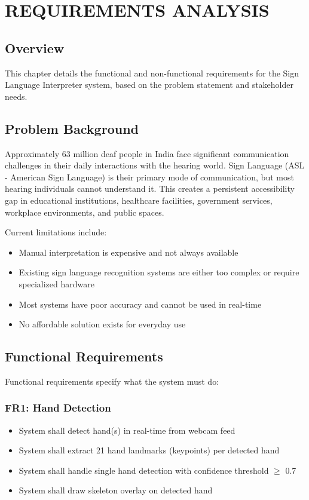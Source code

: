 \chapter{REQUIREMENTS ANALYSIS} \label{c3}
\justifying

\section{Overview}

This chapter details the functional and non-functional requirements for the Sign Language Interpreter system, based on the problem statement and stakeholder needs.

\vspace{1em}
\section{Problem Background}

Approximately 63 million deaf people in India face significant communication challenges in their daily interactions with the hearing world. Sign Language (ASL - American Sign Language) is their primary mode of communication, but most hearing individuals cannot understand it. This creates a persistent accessibility gap in educational institutions, healthcare facilities, government services, workplace environments, and public spaces.

Current limitations include:
\begin{itemize}
    \item Manual interpretation is expensive and not always available
    \item Existing sign language recognition systems are either too complex or require specialized hardware
    \item Most systems have poor accuracy and cannot be used in real-time
    \item No affordable solution exists for everyday use
\end{itemize}

\vspace{1em}
\section{Functional Requirements}

Functional requirements specify what the system must do:

\subsection{FR1: Hand Detection}
\begin{itemize}
    \item System shall detect hand(s) in real-time from webcam feed
    \item System shall extract 21 hand landmarks (keypoints) per detected hand
    \item System shall handle single hand detection with confidence threshold $\ge$ 0.7
    \item System shall draw skeleton overlay on detected hand
\end{itemize}

